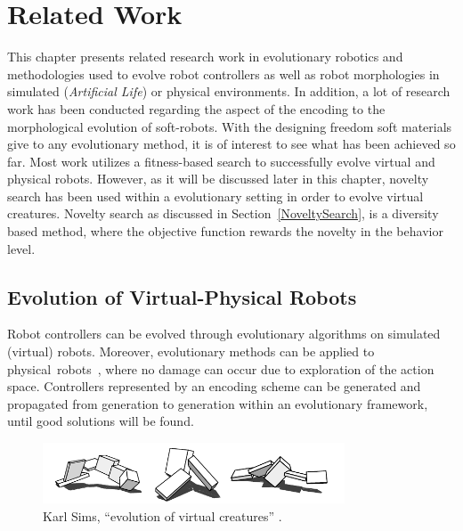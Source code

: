 
\chapter{Related Work} %

\label{Related Work} %


This chapter presents related research work in evolutionary robotics and methodologies used to evolve robot controllers as well as robot morphologies in simulated (\emph{Artificial Life}) or physical environments. In addition, a lot of research work has been conducted regarding the aspect of the encoding to the morphological evolution of soft-robots. With the designing freedom soft materials give to any evolutionary method, it is of interest to see what has been achieved so far. Most work utilizes a fitness-based search to successfully evolve virtual and physical robots. However, as it will be discussed later in this chapter, novelty search has been used within a evolutionary setting in order to evolve virtual creatures. Novelty search as discussed in Section~\ref{NoveltySearch}, is a diversity based method, where the objective function rewards the novelty in the behavior level.


\section{Evolution of Virtual-Physical Robots}

Robot controllers can be evolved through evolutionary algorithms on simulated (virtual) robots. Moreover, evolutionary methods can be applied to physical~robots~\citep{nolfi1994evolve}, where no damage can occur due to exploration of the action space. Controllers represented by an encoding scheme can be generated and propagated from generation to generation within an evolutionary framework, until good solutions will be found.

\begin{figure}[b!]
\centering
\includegraphics[width=0.8\textwidth]{../Figures/Misc/evolvingVirtualCreatures.png}
\caption{Karl Sims, ``evolution of virtual creatures'' \citep{sims1994evolving}.}
\label{fig:karlSims}
\end{figure}


